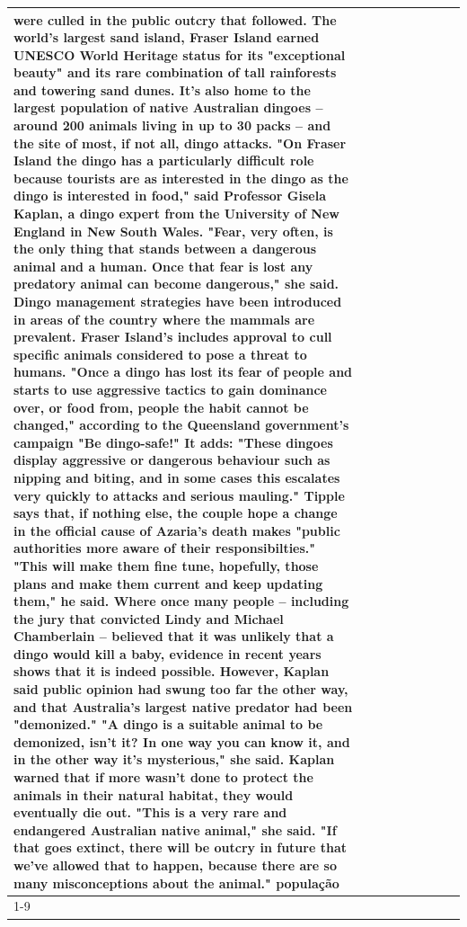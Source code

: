 \begin{table}[H]
\begin{tabular}{lllrlllll}
were culled in the public outcry that followed. The world's largest sand island, Fraser Island earned UNESCO World Heritage status for its "exceptional beauty" and its rare combination of tall rainforests and towering sand dunes. It's also home to the largest population of native Australian dingoes -- around 200 animals living in up to 30 packs -- and the site of most, if not all, dingo attacks. "On Fraser Island the dingo has a particularly difficult role because tourists are as interested in the dingo as the dingo is interested in food," said Professor Gisela Kaplan, a dingo expert from the University of New England in New South Wales. "Fear, very often, is the only thing that stands between a dangerous animal and a human. Once that fear is lost any predatory animal can become dangerous," she said. Dingo management strategies have been introduced in areas of the country where the mammals are prevalent. Fraser Island's includes approval to cull specific animals considered to pose a threat to humans. "Once a dingo has lost its fear of people and starts to use aggressive tactics to gain dominance over, or food from, people the habit cannot be changed," according to the Queensland government's campaign "Be dingo-safe!" It adds: "These dingoes display aggressive or dangerous behaviour such as nipping and biting, and in some cases this escalates very quickly to attacks and serious mauling." Tipple says that, if nothing else, the couple hope a change in the official cause of Azaria's death makes "public authorities more aware of their responsibilties." "This will make them fine tune, hopefully, those plans and make them current and keep updating them," he said. Where once many people -- including the jury that convicted Lindy and Michael Chamberlain -- believed that it was unlikely that a dingo would kill a baby, evidence in recent years shows that it is indeed possible. However, Kaplan said public opinion had swung too far the other way, and that Australia's largest native predator had been "demonized." "A dingo is a suitable animal to be demonized, isn't it? In one way you can know it, and in the other way it's mysterious," she said. Kaplan warned that if more wasn't done to protect the animals in their natural habitat, they would eventually die out. "This is a very rare and endangered Australian native animal," she said. "If that goes extinct, there will be outcry in future that we've allowed that to happen, because there are so many misconceptions about the animal." população \\
\cline{1-9}

\end{tabular}
\end{table}
